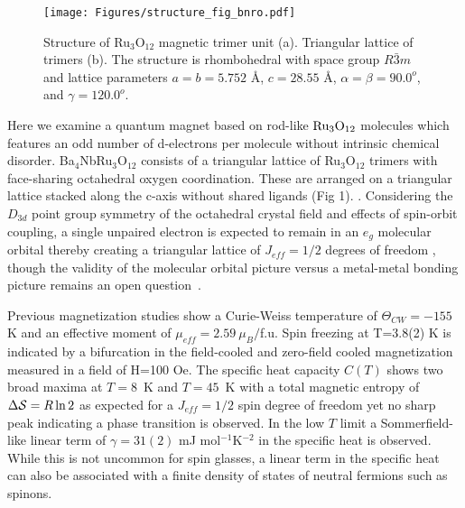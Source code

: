 \documentclass[%
 reprint,
superscriptaddress,
 amsmath,amssymb,
 aps,
 prb,
]{revtex4-2}
\begin{document}
\begin{figure}[b]
\label{structure_fig}
    \centering
    \texttt{[image: Figures/structure\_fig\_bnro.pdf]}
    \caption{Structure of Ru$_3$O$_{12}$ magnetic trimer unit (a). Triangular lattice of trimers (b)\cite{vesta}. The structure is rhombohedral with space group $R\bar{3}m$ and lattice parameters \cite{DRILLON1980507} $a=b=5.752 $ \mbox{\normalfont\AA}, $c=28.55 $ \mbox{\normalfont\AA}, $\alpha=\beta=90.0^o$, and $\gamma=120.0^o$. }
\end{figure}


Here we examine a quantum magnet based on rod-like $\rm Ru_3O_{12}$ molecules which features an odd number of d-electrons per molecule without intrinsic chemical disorder.  Ba$_4$NbRu$_3$O$_{12}$ consists of  a triangular lattice of Ru$_3$O$_{12}$ trimers with face-sharing octahedral oxygen coordination. These are arranged on a triangular lattice stacked along the c-axis without shared ligands (Fig 1). \cite{Bursten1983Ground-StateDodecachlorotrirutheniumII2III}. Considering the $D_{3d}$ point group symmetry of the octahedral crystal field and effects of spin-orbit coupling, a single unpaired electron is expected to remain in an $e_g$ molecular orbital thereby creating a triangular lattice of $J_{eff}= 1/2$ degrees of freedom \cite{Nguyen2018GeometricallyInsulator}, though the validity of the molecular orbital picture versus a metal-metal bonding picture remains an open question~\cite{Komleva2020_MolecularOrbitals}.

Previous magnetization studies show a Curie-Weiss temperature of $\Theta_{CW}=-155$ K and an effective moment of $\mu_{eff}=2.59\ \mu_B/$f.u. Spin freezing at T=3.8(2) K is indicated by a bifurcation in the field-cooled and zero-field cooled magnetization measured in a field of H=100 Oe. The specific heat capacity $C(T)$ shows two broad maxima at $T=8$~K and $T=45$~K with a total magnetic entropy of $\Delta {\cal S}=R\ln2$ as expected for a $J_{eff}=1/2$ spin degree of freedom yet no sharp peak indicating a phase transition is observed\cite{Lieb1961TwoChain,Oshikawa1997MagnetizationSpins}. In the low $T$ limit a Sommerfield-like linear term of $\gamma=31(2) $ mJ mol$^{-1}$K$^{-2}$ in the specific heat is observed. While this is not uncommon for spin glasses, a linear term in the specific heat can also be associated with a finite density of states of neutral fermions such as spinons. 
\end{document}
